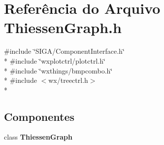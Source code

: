 \section{Referência do Arquivo Thiessen\+Graph.\+h}
\label{_thiessen_graph_8h}
{\ttfamily \#include \char`\"{}S\+I\+G\+A/\+Component\+Interface.\+h\char`\"{}}\\*
{\ttfamily \#include \char`\"{}wxplotctrl/plotctrl.\+h\char`\"{}}\\*
{\ttfamily \#include \char`\"{}wxthings/bmpcombo.\+h\char`\"{}}\\*
{\ttfamily \#include $<$wx/treectrl.\+h$>$}\\*
\subsection*{Componentes}
\begin{DoxyCompactItemize}
\item 
class {\bf Thiessen\+Graph}
\end{DoxyCompactItemize}
